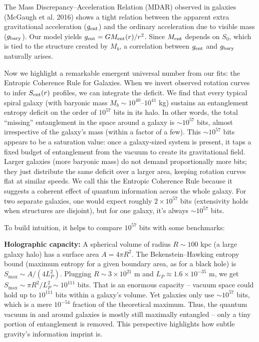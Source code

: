 \documentclass[11pt]{article}
\begin{document}
The Mass Discrepancy–Acceleration Relation (MDAR) observed in galaxies (McGaugh et al. 2016) shows a tight relation between the apparent extra gravitational acceleration ($g_{\rm ent}$) and the ordinary acceleration due to visible mass ($g_{\rm bary}$). Our model yields $g_{\rm ent} = G M_{\rm ent}(r) / r^2$. Since $M_{\rm ent}$ depends on $S_0$, which is tied to the structure created by $M_b$, a correlation between $g_{\rm ent}$ and $g_{\rm bary}$ naturally arises.

Now we highlight a remarkable emergent universal number from our fits: the Entropic Coherence Rule for Galaxies. When we invert observed rotation curves to infer $S_{\rm ent}(r)$ profiles, we can integrate the deficit. We find that every typical spiral galaxy (with baryonic mass $M_b \sim 10^{40}$–$10^{41}$ kg) sustains an entanglement entropy deficit on the order of $10^{57}$ bits in its halo. In other words, the total “missing” entanglement in the space around a galaxy is $\sim 10^{57}$ bits, almost irrespective of the galaxy’s mass (within a factor of a few)​. This $\sim 10^{57}$ bits appears to be a saturation value: once a galaxy-sized system is present, it taps a fixed budget of entanglement from the vacuum to create its gravitational field. Larger galaxies (more baryonic mass) do not demand proportionally more bits; they just distribute the same deficit over a larger area, keeping rotation curves flat at similar speeds​. We call this the Entropic Coherence Rule because it suggests a coherent effect of quantum information across the whole galaxy. For two separate galaxies, one would expect roughly $2\times10^{57}$ bits (extensivity holds when structures are disjoint), but for one galaxy, it’s always $\sim 10^{57}$ bits.

To build intuition, it helps to compare $10^{57}$ bits with some benchmarks:

\textbf{Holographic capacity:} A spherical volume of radius $R \sim 100$ kpc (a large galaxy halo) has a surface area $A = 4\pi R^2$. The Bekenstein–Hawking entropy bound (maximum entropy for a given boundary area, as for a black hole) is $S_{\max} \sim A/(4 L_P^2)$. Plugging $R \sim 3\times10^{21}$ m and $L_P \approx 1.6\times10^{-35}$ m, we get $S_{\max} \sim \pi R^2/L_P^2 \sim 10^{111}$ bits​. That is an enormous capacity – vacuum space could hold up to $10^{111}$ bits within a galaxy’s volume. Yet galaxies only use $\sim 10^{57}$ bits, which is a mere $10^{-54}$ fraction of the theoretical maximum. Thus, the quantum vacuum in and around galaxies is mostly still maximally entangled – only a tiny portion of entanglement is removed. This perspective highlights how subtle gravity’s information imprint is.
\end{document}
